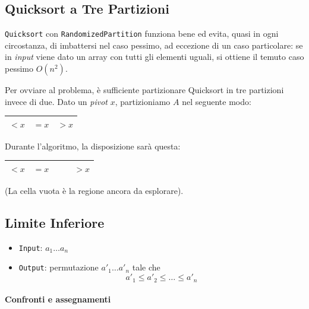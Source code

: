 \subsection{Quicksort a Tre Partizioni}
\texttt{Quicksort} con \texttt{RandomizedPartition} funziona bene ed 
evita, quasi in ogni circostanza, di imbattersi nel caso pessimo, ad 
eccezione di un caso particolare: se in \emph{input} viene dato un 
array con tutti gli elementi uguali, si ottiene il temuto caso pessimo $O(n^2)$.\par
Per ovviare al problema, è sufficiente partizionare Quicksort in tre
partizioni invece di due. Dato un \emph{pivot} $x$, partizioniamo $A$ nel
seguente modo:

\begin{center}
    \begin{tabular}{|l|l|l|}
        \hline 
        $< x$ & $= x$ & $> x$ \\
        \hline
    \end{tabular}
\end{center}

Durante l'algoritmo, la disposizione sarà questa:

\begin{center}
    \begin{tabular}{|l|l|l|l|}
        \hline 
        $< x$ & $= x$ & $\quad$ & $> x$ \\
        \hline
    \end{tabular}
\end{center}
(La cella vuota è la regione ancora da esplorare).

 



\subsection{Limite Inferiore}

\begin{itemize}[label=]
    \item \texttt{Input}: $a_1 \dots a_n$
    \item \texttt{Output}: permutazione $a'_1 \dots a'_n$ tale che
    $$a'_1 \leq a'_2 \leq \dots \leq a'_n$$
\end{itemize}

\paragraph{Confronti e assegnamenti} 

